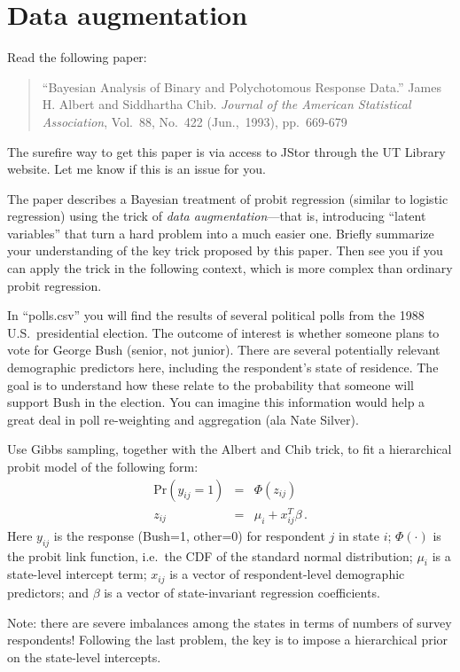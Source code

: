 \documentclass{mynotes}
\begin{document}
\section{Data augmentation}

Read the following paper:
\begin{quotation}
``Bayesian Analysis of Binary and Polychotomous Response Data.''  James H. Albert and Siddhartha Chib.  \textit{Journal of the American Statistical Association}, Vol.~88, No.~422 (Jun.,~1993), pp.~669-679
\end{quotation}
The surefire way to get this paper is via access to JStor through the UT Library website.  Let me know if this is an issue for you.

The paper describes a Bayesian treatment of probit regression (similar to logistic regression) using the trick of \textit{data augmentation}---that is, introducing ``latent variables'' that turn a hard problem into a much easier one.  Briefly summarize your understanding of the key trick proposed by this paper.  Then see you if you can apply the trick in the following context, which is more complex than ordinary probit regression.

In ``polls.csv'' you will find the results of several political polls from the 1988 U.S.~presidential election.  The outcome of interest is whether someone plans to vote for George Bush (senior, not junior).  There are several potentially relevant demographic predictors here, including the respondent's state of residence.  The goal is to understand how these relate to the probability that someone will support Bush in the election.  You can imagine this information would help a great deal in poll re-weighting and aggregation (ala Nate Silver).

Use Gibbs sampling, together with the Albert and Chib trick, to fit a hierarchical probit model of the following form:
\begin{eqnarray*}
\mbox{Pr}(y_{ij} = 1) &=& \Phi(z_{ij})  \\
z_{ij} &=& \mu_i + x_{ij}^T \beta \, .
\end{eqnarray*}
Here $y_{ij}$ is the response (Bush=1, other=0) for respondent $j$ in state $i$; $\Phi(\cdot)$ is the probit link function, i.e.~the CDF of the standard normal distribution; $\mu_i$ is a state-level intercept term; $x_{ij}$ is a vector of respondent-level demographic predictors; and $\beta$ is a vector of state-invariant regression coefficients.

Note: there are severe imbalances among the states in terms of numbers of survey respondents!  Following the last problem, the key is to impose a hierarchical prior on the state-level intercepts.
\end{document}
